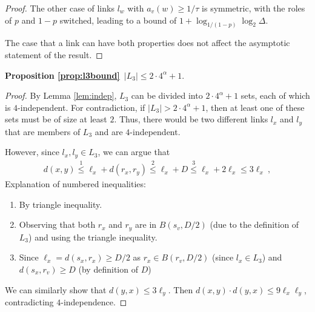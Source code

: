 \documentclass[11pt]{amsart}
\begin{document}
\begin{proof}
The other case of links $l_w$ with $a_v(w) \ge 1/\tau$
is symmetric, with the roles of $p$ and $1-p$ switched, leading to a bound of $1 + \log_{1/(1-p)} \log_2 \Delta$. 

The case that a link can have both properties does not affect the asymptotic statement of the result.
\end{proof}


\medskip

\noindent \textbf{Proposition \ref{prop:l3bound}}\ 
$|L_3| \leq  2 \cdot 4^{\alpha} + 1$.
\smallskip

\begin{proof}
By Lemma \ref{lem:indep}, $L_3$ can be divided into $2 \cdot
4^{\alpha} + 1$ sets, each of which is $4$-independent.  For
contradiction, if $|L_3| > 2 \cdot 4^{\alpha} + 1$, then at least one
of these sets must be of size at least $2$.  Thus, there would be two
different links $l_x$ and $l_y$ that are members of $L_3$ and
are $4$-independent.

However, since $l_x, l_y \in L_3$, we can argue that 
\begin{align*}
d(x,  y) \overset{1}{\leq} \ell_x + d(r_x, r_y)   \overset{2}{\leq} \ell_x + D \overset{3}{\leq} \ell_x + 2 \ell_x \leq 3 \ell_x\ ,
\end{align*}
Explanation of numbered inequalities:
\begin{enumerate}
\item By triangle inequality.
\item Observing that both  $r_x$ and $r_y$ are in $B(s_v, D/2)$ (due to the definition of $L_3$) and using the triangle inequality.
\item Since $\ell_x = d(s_x, r_x) \geq D/2$ as $r_x \in B(r_v, D/2)$ (since $l_x \in L_3$) and $d(s_x, r_v) \geq D$ (by definition of $D$)
\end{enumerate}

We can similarly show that $d(y, x) \leq 3 \ell_y$. Then $d(x, y) \cdot d(y, x) \leq 9 \ell_x \ell_y$, contradicting $4$-independence.
\end{proof}
\end{document}
